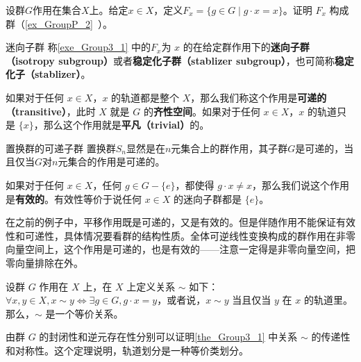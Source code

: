 \begin{exercise}{}\label{exe_Group3_1}
设群$G$作用在集合$X$上。给定$x\in X$，定义$F_x=\{g\in G\mid g\cdot x=x\}$。证明 $F_x$ 构成群（\autoref{ex_GroupP_2}~）。
\end{exercise}




\begin{definition}{迷向子群}
称\autoref{exe_Group3_1} 中的$F_x$为 $x$ 的在给定群作用下的\textbf{迷向子群（isotropy subgroup）}或者\textbf{稳定化子群（stablizer subgroup）}，也可简称\textbf{稳定化子（stablizer）}。
\end{definition}






\begin{definition}{}
如果对于任何 $x\in X$，$x$ 的轨道都是整个 $X$，那么我们称这个作用是\textbf{可递的（transitive）}，此时 $X$ 就是 $G$ 的\textbf{齐性空间}。如果对于任何 $x\in X$，$x$ 的轨道只是 $\{x\}$，那么这个作用就是\textbf{平凡（trivial）}的。
\end{definition}

\begin{example}{置换群的可递子群}\label{ex_Group3_4}
置换群$S_n$显然是在$n$元集合上的群作用，其子群$G$是可递的，当且仅当$G$对$n$元集合的作用是可递的。
\end{example}

如果对于任何 $x\in X$，任何 $g\in G-\{e\}$，都使得 $g\cdot x\not=x$，那么我们说这个作用是\textbf{有效的}。有效性等价于说任何 $x\in X$ 的迷向子群都是 $\{e\}$。

在之前的例子中，平移作用既是可递的，又是有效的。但是伴随作用不能保证有效性和可递性，具体情况要看群的结构性质。全体可逆线性变换构成的群作用在非零向量空间上，这个作用是可递的，也是有效的——注意一定得是非零向量空间，把零向量排除在外。

\begin{theorem}{}\label{the_Group3_1}
设群 $G$ 作用在 $X$ 上，在 $X$ 上定义关系 $\sim$ 如下：$\forall x, y\in X, x\sim y \iff \exists g\in G, g\cdot x=y$，或者说，$x\sim y$ 当且仅当 $y$ 在 $x$ 的轨道里。那么，$\sim$ 是一个等价关系。
\end{theorem}

由群 $G$ 的封闭性和逆元存在性分别可以证明\autoref{the_Group3_1} 中关系 $\sim$ 的传递性和对称性。这个定理说明，轨道划分是一种等价类划分。






